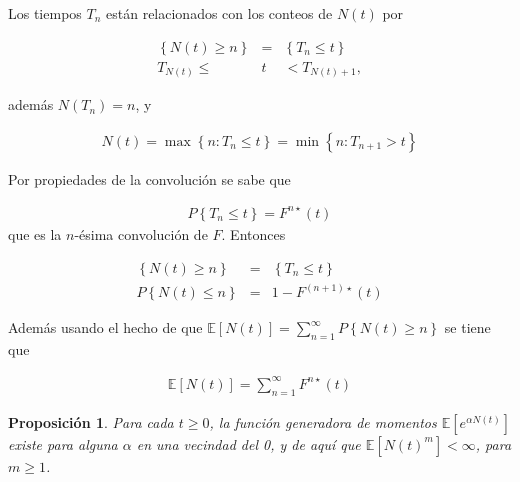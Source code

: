 \documentclass{article}
\newtheorem{Prop}{Proposición}
\newcommand{\esp}{\mathbb{E}}
\begin{document}
%
%

Los tiempos $T_{n}$ est\'an relacionados con los conteos de $N\left(t\right)$ por

\begin{eqnarray*}
\left\{N\left(t\right)\geq n\right\}&=&\left\{T_{n}\leq t\right\}\\
T_{N\left(t\right)}\leq &t&<T_{N\left(t\right)+1},
\end{eqnarray*}

adem\'as $N\left(T_{n}\right)=n$, y 

\begin{eqnarray*}
N\left(t\right)=\max\left\{n:T_{n}\leq t\right\}=\min\left\{n:T_{n+1}>t\right\}
\end{eqnarray*}

Por propiedades de la convoluci\'on se sabe que

\begin{eqnarray*}
P\left\{T_{n}\leq t\right\}=F^{n\star}\left(t\right)
\end{eqnarray*}
que es la $n$-\'esima convoluci\'on de $F$. Entonces 

\begin{eqnarray*}
\left\{N\left(t\right)\geq n\right\}&=&\left\{T_{n}\leq t\right\}\\
P\left\{N\left(t\right)\leq n\right\}&=&1-F^{\left(n+1\right)\star}\left(t\right)
\end{eqnarray*}

Adem\'as usando el hecho de que $\esp\left[N\left(t\right)\right]=\sum_{n=1}^{\infty}P\left\{N\left(t\right)\geq n\right\}$
se tiene que

\begin{eqnarray*}
\esp\left[N\left(t\right)\right]=\sum_{n=1}^{\infty}F^{n\star}\left(t\right)
\end{eqnarray*}

\begin{Prop}
Para cada $t\geq0$, la funci\'on generadora de momentos $\esp\left[e^{\alpha N\left(t\right)}\right]$ existe para alguna $\alpha$ en una vecindad del 0, y de aqu\'i que $\esp\left[N\left(t\right)^{m}\right]<\infty$, para $m\geq1$.
\end{Prop}
\end{document}
